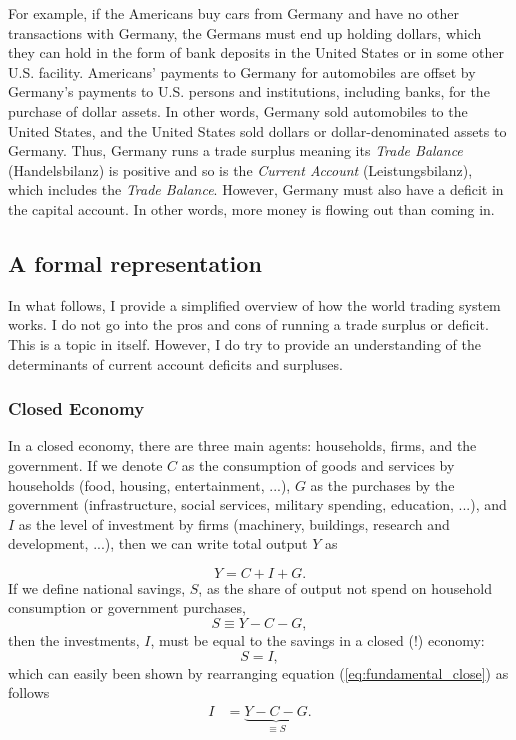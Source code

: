 For example, if the Americans buy cars from Germany and have no other transactions with Germany, the Germans must end up holding dollars, which they can hold in the form of bank deposits in the United States or in some other U.S. facility. Americans' payments to Germany for automobiles are offset by Germany's payments to U.S. persons and institutions, including banks, for the purchase of dollar assets. In other words, Germany sold automobiles to the United States, and the United States sold dollars or dollar-denominated assets to Germany.
Thus, Germany runs a trade surplus meaning its \textit{Trade Balance} (Handelsbilanz) is positive and so is the \textit{Current Account} (Leistungsbilanz), which includes the \textit{Trade Balance}. 
However, Germany must also have a deficit in the capital account. In other words, more money is flowing out than coming in. 

\pbn
\subsection{A formal representation}
In what follows, I provide a simplified overview of how the world trading system works. I do not go into the pros and cons of running a trade surplus or deficit. This is a topic in itself. However, I do try to provide an understanding of the determinants of current account deficits and surpluses. 

\subsubsection*{Closed Economy}
In a closed economy, there are three main agents: households, firms, and the government. If we denote $C$ as the consumption of goods and services by households (food, housing, entertainment, ...), $G$ as the purchases by the government (infrastructure, social services, military spending, education, ...), and $I$ as the level of investment by firms (machinery, buildings, research and development, ...), then we can write total output $Y$ as 

\begin{equation}
	Y=C+I+G.\label{eq:fundamental_close}
\end{equation}
If we define national savings, $S$, as the share of output not spend on household consumption or government purchases, \[S\equiv Y-C-G,\]
then the investments, $I$, must be equal to the savings in a closed (!) economy:
\[S=I,\] 
which can easily been shown by rearranging equation (\ref{eq:fundamental_close}) as follows
\begin{align*}
	I&=\underbrace{Y-C-G}_{\equiv S}.
\end{align*}

